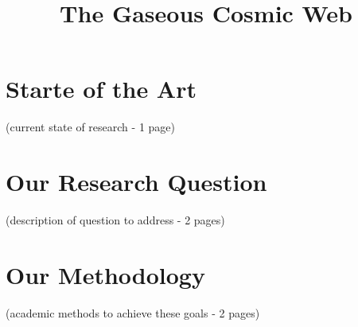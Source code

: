 \documentclass[12pt]{article}
\title{The Gaseous Cosmic Web}
\begin{document}
\maketitle

\section{Starte of the Art}
(current state of research - 1 page)

\section{Our Research Question}
(description of question to address - 2 pages)

\section{Our Methodology}
(academic methods to achieve these goals - 2 pages)


\end{document}
